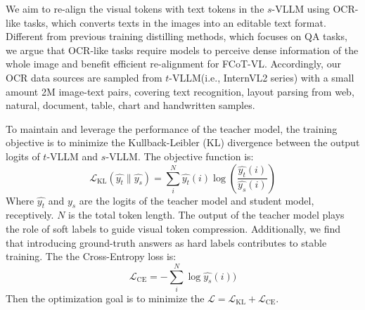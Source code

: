 We aim to re-align the visual tokens with text tokens in the $s$-VLLM using OCR-like tasks, which converts texts in the images into an editable text format. Different from previous training distilling methods, which focuses on QA tasks, we argue that OCR-like tasks  require models to perceive dense information of the whole image and benefit efficient re-alignment for FCoT-VL. Accordingly, our OCR data sources are sampled from $t$-VLLM(i.e., InternVL2 series) with a small amount 2M image-text pairs, covering text recognition, layout parsing from web, natural, document, table, chart and handwritten samples. 

To maintain and leverage the performance of the teacher model,
the training objective is to minimize the Kullback-Leibler (KL) divergence between the output logits of $t$-VLLM and $s$-VLLM. The objective function is:
\begin{equation}
    \mathcal{L}_{\text{KL}}(\hat{y_t} \parallel \hat{y_s}) = \sum_{i}^{N} \hat{y_t}(i) \log \left( \frac{\hat{y_t}(i)}{\hat{y_s}(i)} \right)
\end{equation}
Where $\hat{y_t}$ and $\hat{y_s}$ are the logits of the teacher model and student model, receptively. $N$ is the total token length. The output of the teacher model plays the role of soft labels to guide visual token compression. Additionally, we find that introducing ground-truth answers as hard labels contributes to stable training. The the Cross-Entropy loss is:
\begin{equation}
    \mathcal{L}_{\text{CE}} = -\sum_{i}^{N}\log\hat{y_s}(i))
\end{equation}
Then the optimization goal is to minimize the $\mathcal{L}=\mathcal{L}_{\text{KL}} + \mathcal{L}_{\text{CE}}$.

